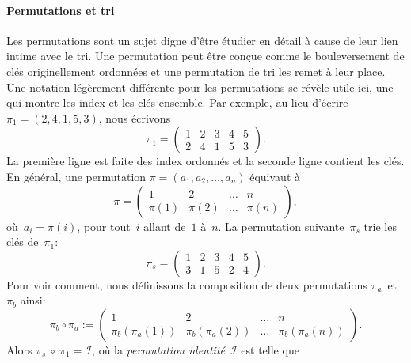 \paragraph{Permutations et tri}

Les permutations sont un sujet digne d'être
étudier en détail à cause de leur lien intime avec le tri. Une
permutation peut être conçue comme le bouleversement de clés
originellement ordonnées et une permutation de tri les remet à leur
place. Une notation légèrement différente pour les permutations se
révèle utile ici, une qui montre les index et les clés ensemble. Par
exemple, au lieu d'écrire \(\pi_1 = (2,4,1,5,3)\), nous écrivons
\begin{equation*}
\pi_1 =
\begin{pmatrix}
1 & 2 & 3 & 4 & 5\\
2 & 4 & 1 & 5 & 3
\end{pmatrix}.
\end{equation*}
La première ligne est faite des index ordonnés et la seconde ligne
contient les clés. En général, une permutation \(\pi =
(a_1,a_2,\dots,a_n)\) équivaut à
\begin{equation*}
\pi =
\begin{pmatrix}
     1 &      2 & \dots &     n\\
\pi(1) & \pi(2) & \dots & \pi(n)
\end{pmatrix},
\end{equation*}
où~\(a_i = \pi(i)\), pour tout~\(i\) allant de~\(1\) à~\(n\). La
permutation suivante~\(\pi_s\) trie les clés de~\(\pi_1\):
\begin{equation*}
\pi_s =
\begin{pmatrix}
1 & 2 & 3 & 4 & 5\\
3 & 1 & 5 & 2 & 4
\end{pmatrix}.
\end{equation*}
Pour voir comment, nous définissons la composition
 de deux
permutations \(\pi_a\)~et~\(\pi_b\) ainsi:
\begin{equation*}
\pi_b \circ \pi_a :=
\begin{pmatrix}
              1 &               2 & \dots & n\\
\pi_b(\pi_a(1)) & \pi_b(\pi_a(2)) & \dots & \pi_b(\pi_a(n))
\end{pmatrix}.
\end{equation*}
Alors \(\pi_s~\circ~\pi_1 = \mathcal{I}\), où la \emph{permutation
  identité}~\(\mathcal{I}\) est telle que
